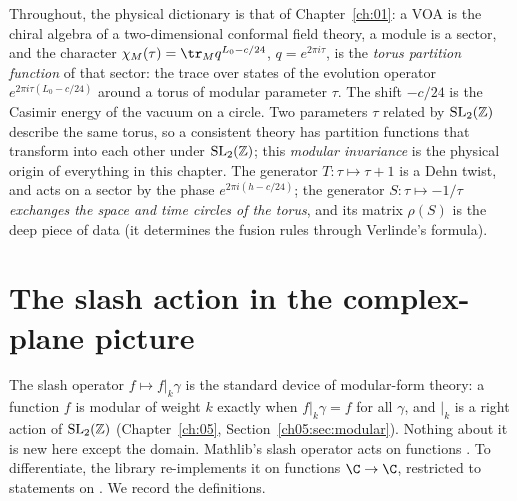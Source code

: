 \begin{physics}
Throughout, the physical dictionary is that of Chapter~\ref{ch:01}: a VOA is the chiral algebra of a two-dimensional
conformal field theory, a module is a sector, and the character
$\chi_M(\tau) = \tr_M q^{L_0-c/24}$, $q = e^{2\pi i\tau}$, is the \emph{torus partition function} of that sector: the
trace over states of the evolution operator $e^{2\pi i\tau(L_0-c/24)}$ around a torus of modular parameter $\tau$. The
shift $-c/24$ is the Casimir energy of the vacuum on a circle. Two parameters $\tau$ related by $\mathrm{SL}_2(\mathbb{Z})$ describe the
same torus, so a consistent theory has partition functions that transform into each other under $\mathrm{SL}_2(\mathbb{Z})$; this
\emph{modular invariance} is the physical origin of everything in this chapter. The generator $T:\tau\mapsto\tau+1$ is a
Dehn twist, and acts on a sector by the phase $e^{2\pi i(h-c/24)}$; the generator $S:\tau\mapsto-1/\tau$
\emph{exchanges the space and time circles of the torus}, and its matrix $\rho(S)$ is the deep piece of data (it determines
the fusion rules through Verlinde's formula).
\end{physics}

\section{The slash action in the complex-plane picture}\label{l14:sec:slash}

The slash operator $f\mapsto f|_k\gamma$ is the standard device of modular-form theory: a function $f$ is modular of weight $k$
exactly when $f|_k\gamma = f$ for all $\gamma$, and $|_k$ is a right action of $\mathrm{SL}_2(\mathbb{Z})$ (Chapter~\ref{ch:05},
Section~\ref{ch05:sec:modular}). Nothing about it is new here except the domain.
Mathlib's slash operator  acts on functions . To differentiate, the library re-implements it on
functions $\C\to\C$, restricted to statements on . We record the definitions.

